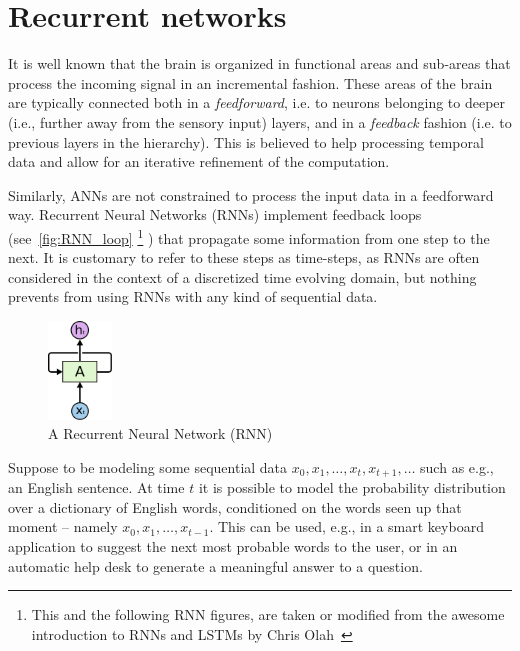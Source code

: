 \section{Recurrent networks}\label{sec:rnn}
%
It is well known that the brain is organized in functional areas and sub-areas
that process the incoming signal in an incremental fashion. These areas of the
brain are typically connected both in a \emph{feedforward}, i.e. to neurons
belonging to deeper (i.e., further away from the sensory input) layers, and in
a \emph{feedback} fashion (i.e. to previous layers in the hierarchy). This is
believed to help processing temporal data and allow for an iterative refinement
of the computation.

Similarly, ANNs are not constrained to process the input data in a feedforward
way. Recurrent Neural Networks (RNNs) implement feedback loops
(see~\autoref{fig:RNN_loop} \footnote{This and the following RNN figures, are
    taken or modified from the awesome introduction to RNNs and LSTMs by Chris
    Olah~\citep{olah2015rnns}}
) that propagate some information from one step to
the next. It is customary to refer to these steps as time-steps, as RNNs are
often considered in the context of a discretized time evolving domain, but
nothing prevents from using RNNs with any kind of sequential data.

\begin{figure}[h]
    \centering
    \includegraphics[width=0.15\textwidth]{pdf/RNN_loop.pdf}
    \caption{A Recurrent Neural Network (RNN)\label{fig:RNN_loop}}
\end{figure}

Suppose to be modeling some sequential data $x_0, x_1, \dots , x_t, x_{t+1},
\dots$ such as e.g., an English sentence. At time $t$ it is possible to model
the probability distribution over a dictionary of English words, conditioned on
the words seen up that moment -- namely $x_0, x_1, \dots , x_{t-1}$. This can
be used, e.g., in a smart keyboard application to suggest the next most
probable words to the user, or in an automatic help desk to generate a
meaningful answer to a question.

